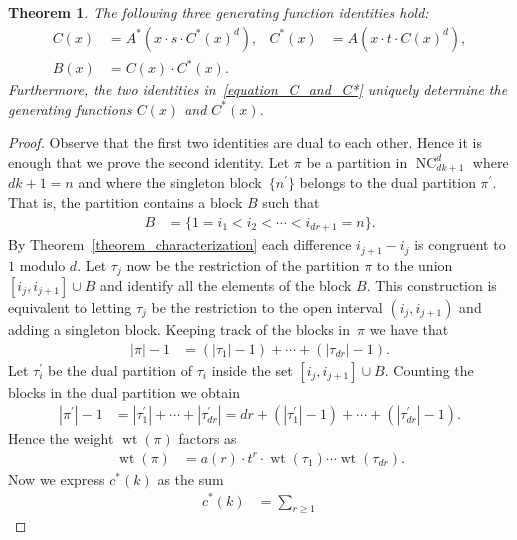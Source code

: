 \documentclass[11pt]{amsart}
\newtheorem{theorem}{Theorem}[section]
\numberwithin{equation}{section}
\DeclareMathOperator{\wt}{wt}
\DeclareMathOperator{\NC}{NC}
\begin{document}
\begin{theorem}
The following three generating function identities hold:
\begin{align}
\label{equation_C_and_C*}
C(x)
& =
A^{*}\left(x \cdot s \cdot C^{*}(x)^{d}\right) ,
&
C^{*}(x)
& =
A\left(x \cdot t \cdot C(x)^{d}\right) , \\
B(x) & = C(x) \cdot C^{*}(x) .
\end{align}
Furthermore, the two identities in~\eqref{equation_C_and_C*} uniquely determine
the generating functions $C(x)$ and $C^{*}(x)$.
\label{theorem_generating_functions_C_and_C*}
\end{theorem}
\begin{proof}
Observe that the first two identities are dual to each other. Hence it
is enough 
that we prove the second identity.
Let $\pi$ be a partition in $\NC^{d}_{dk+1}$ where $dk+1 = n$
and where the singleton block~$\{n^{\prime}\}$
belongs to the dual partition $\pi^{\prime}$.
That is, the partition contains a block $B$ such that
\begin{align*}
B
& =
\{1 = i_{1} < i_{2} < \cdots < i_{dr+1} = n\} .
\end{align*}
By Theorem~\ref{theorem_characterization}
each difference $i_{j+1} - i_{j}$ is congruent to $1$ modulo $d$.
Let $\tau_{j}$ now be the restriction of the partition $\pi$
to the union $[i_{j},i_{j+1}] \cup B$ and identify all the elements of the block $B$.
This construction is equivalent to letting $\tau_{j}$ be the restriction to the
open interval $(i_{j},i_{j+1})$ and adding a singleton block.
Keeping track of the blocks in~$\pi$ we have that
\begin{align*}
|\pi| - 1
& =
(|\tau_{1}| - 1)
+ \cdots +
(|\tau_{dr}| - 1) .
\end{align*}
Let $\tau_{i}^{\prime}$ be the dual partition of $\tau_{i}$ inside the set $[i_{j},i_{j+1}] \cup B$.
Counting the blocks in the dual partition we obtain
\begin{align*}
|\pi^{\prime}| - 1
& =
|\tau^{\prime}_{1}|
+ \cdots +
|\tau^{\prime}_{dr}|
=
dr
+
(|\tau^{\prime}_{1}| - 1)
+ \cdots +
(|\tau^{\prime}_{dr}| - 1) .
\end{align*}
Hence the weight $\wt(\pi)$ factors as
\begin{align*}
\wt(\pi)
& =
a(r)
\cdot
t^{r}
\cdot
\wt(\tau_{1})
\cdots
\wt(\tau_{dr}) .
\end{align*}
Now we express $c^{*}(k)$ as the sum
\begin{align}
\label{equation_recursion_for_c*}
c^{*}(k)
& =
\sum_{r \geq 1}

\end{align}
\end{proof}
\end{document}
